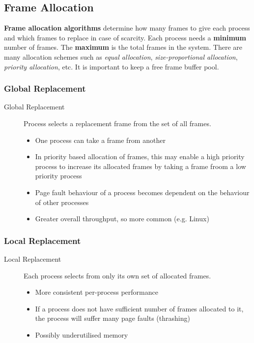 \documentclass{article}%
\begin{document}
\subsection{Frame Allocation}
\label{sec:orgb60ec21}
\textbf{Frame allocation algorithms} determine how many frames to give each process and which frames to replace in case of scarcity.
Each process needs a \textbf{minimum} number of frames.
The \textbf{maximum} is the total frames in the system.
There are many allocation schemes such as \emph{equal allocation}, \emph{size-proportional allocation}, \emph{priority allocation}, etc.
It is important to keep a free frame buffer pool.

\subsubsection{Global Replacement}
\label{sec:orgfa26708}
\begin{description}
\item[{Global Replacement}] Process selects a replacement frame from the set of all frames.
\begin{itemize}
\item One process can take a frame from another
\item In priority based allocation of frames, this may enable a high priority process to increase its allocated frames by taking a frame froom a low priority process
\item Page fault behaviour of a process becomes dependent on the behaviour of other processes
\item Greater overall throughput, so more common (e.g. Linux)
\end{itemize}
\end{description}
\subsubsection{Local Replacement}
\label{sec:org71f869e}
\begin{description}
\item[{Local Replacement}] Each process selects from only its own set of allocated frames.
\begin{itemize}
\item More consistent per-process performance
\item If a process does not have sufficient number of frames allocated to it, the process will suffer many page faults (thrashing)
\item Possibly underutilised memory
\end{itemize}
\end{description}
\end{document}
